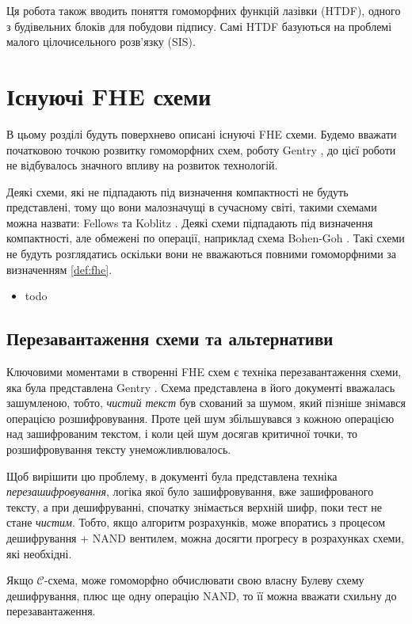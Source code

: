 Ця робота також вводить поняття гомоморфних функцій лазівки (HTDF), одного з будівельних
блоків для побудови підпису. Самі HTDF базуються на проблемі малого цілочисельного розв'язку (SIS).

\section{Існуючі FHE схеми}
В цьому розділі будуть поверхнево описані існуючі FHE схеми. Будемо вважати початковою
точкою розвитку гомоморфних схем, роботу Gentry \cite{homenc}, до цієї роботи не 
відбувалось значного впливу на розвиток технологій.

Деякі схеми, які не підпадають під визначення компактності не будуть представлені, тому що
вони малозначущі в сучасному світі, такими схемами можна назвати: Fellows та Koblitz
\cite{fellows1994}. Деякі схеми підпадають під визначення компактності, але обмежені по
операції, наприклад схема Bohen-Goh \cite{10.1007/978-3-540-30576-7_18}. Такі схеми не
будуть розглядатись оскільки вони не вважаються повними гомоморфними за визначенням \ref{def:fhe}.

\begin{itemize}
    \item{todo}
\end{itemize}

\subsection{Перезавантаження схеми та альтернативи}
Ключовими моментами в створенні FHE схем є техніка перезавантаження схеми, яка була
представлена Gentry \cite{homenc}. Схема представлена в його документі вважалась зашумленою,
тобто, \emph{чистий текст} був схований за шумом, який пізніше знімався операцією
розшифровування. Проте цей шум збільшувався з кожною операцією над зашифрованим текстом,
і коли цей шум досягав критичної точки, то розшифровування тексту унеможливлювалось.

Щоб вирішити цю проблему, в документі була представлена техніка \emph{перезашифровування},
логіка якої було зашифровування, вже зашифрованого тексту, а при дешифруванні, спочатку
знімається верхній шифр, поки тест не стане \emph{чистим}. Тобто, якщо алгоритм 
розрахунків, може впоратись з процесом дешифрування + \textsc{NAND} вентилем, можна
досягти прогресу в розрахунках схеми, які необхідні.

\begin{definition}
    Якщо \(\mathcal{C}\)-схема, може гомоморфно обчислювати свою власну Булеву схему
    дешифрування, плюс ще одну операцію \textsc{NAND}, то її можна вважати схильну до
    перезавантаження.
\end{definition}

